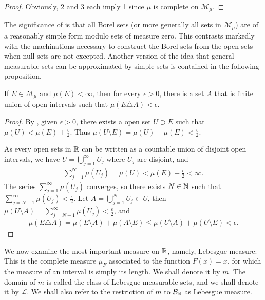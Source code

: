 \begin{proof}
    Obviously, 2 and 3 each imply 1 since $\mu$ is complete on $\mathcal{M}_{\mu}$.
\end{proof}

The significance of is that all Borel sets (or more generally all sets in $\mathcal{M}_{\mu}$) are of a reasonably simple form modulo sets of measure zero. 
This contrasts markedly with the machinations necessary to construct the Borel sets from the open sets when null sets are not excepted.
Another version of the idea that general measurable sets can be approximated by simple sets is contained in the following proposition.

\begin{proposition}
    If $E \in \mathcal{M}_{\mu}$ and $\mu(E) < \infty$, then for every $\epsilon > 0$, there is a set $A$ that is finite union of open intervals such that $\mu(E \triangle A) < \epsilon$.
\end{proposition}

\begin{proof}
    By , given $\epsilon > 0$, there exists a open set $U \supset E$ such that $\mu(U) < \mu(E) + \frac{\epsilon}{2}$.
    Thus $\mu(U \setminus E) = \mu(U) - \mu(E) < \frac{\epsilon}{2}$.

    As every open sets in $\mathbb{R}$ can be written as a countable union of disjoint open intervals, we have $U = \bigcup_{j=1}^{\infty} U_j$ where $U_j$ are disjoint, and 
    \begin{align}
        \sum_{j=1}^{\infty} \mu(U_j) = \mu(U) < \mu(E) + \frac{\epsilon}{2} < \infty.
    \end{align}
    The series $\sum_{j=1}^{\infty} \mu(U_j)$ converges, so there exists $N \in \mathbb{N}$ such that $\sum_{j=N+1}^{\infty} \mu(U_j) < \frac{\epsilon}{2}$.
    Let $A = \bigcup_{j=1}^{N} U_j \subset U$, then $\mu(U \setminus A) = \sum_{j=N+1}^{\infty} \mu(U_j) < \frac{\epsilon}{2}$, and
    \begin{align}
        \mu(E \triangle A) = \mu(E \setminus A) + \mu(A \setminus E) \le \mu(U \setminus A) + \mu(U \setminus E) < \epsilon.
    \end{align}
\end{proof}

We now examine the most important measure on $\mathbb{R}$, namely, Lebesgue measure: 
This is the complete measure $\mu_F$ associated to the function $F(x) = x$, for which the measure of an interval is simply its length. 
We shall denote it by $m$. 
The domain of $m$ is called the class of Lebesgue measurable sets, and we shall denote it by $\mathcal{L}$. 
We shall also refer to the restriction of $m$ to $\mathcal{B}_{\mathbb{R}}$ as Lebesgue measure.



